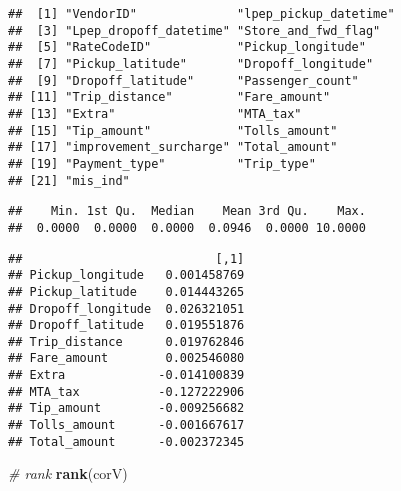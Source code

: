 \documentclass[]{article}
\newenvironment{Shaded}{\begin{snugshade}}{\end{snugshade}}
\newcommand{\KeywordTok}[1]{\textcolor[rgb]{0.13,0.29,0.53}{\textbf{{#1}}}}
\newcommand{\DataTypeTok}[1]{\textcolor[rgb]{0.13,0.29,0.53}{{#1}}}
\newcommand{\StringTok}[1]{\textcolor[rgb]{0.31,0.60,0.02}{{#1}}}
\newcommand{\CommentTok}[1]{\textcolor[rgb]{0.56,0.35,0.01}{\textit{{#1}}}}
\newcommand{\NormalTok}[1]{{#1}}
\begin{document}
\begin{verbatim}
##  [1] "VendorID"              "lpep_pickup_datetime" 
##  [3] "Lpep_dropoff_datetime" "Store_and_fwd_flag"   
##  [5] "RateCodeID"            "Pickup_longitude"     
##  [7] "Pickup_latitude"       "Dropoff_longitude"    
##  [9] "Dropoff_latitude"      "Passenger_count"      
## [11] "Trip_distance"         "Fare_amount"          
## [13] "Extra"                 "MTA_tax"              
## [15] "Tip_amount"            "Tolls_amount"         
## [17] "improvement_surcharge" "Total_amount"         
## [19] "Payment_type"          "Trip_type"            
## [21] "mis_ind"
\end{verbatim}

\begin{Shaded}
\end{Shaded}

\begin{verbatim}
##    Min. 1st Qu.  Median    Mean 3rd Qu.    Max. 
##  0.0000  0.0000  0.0000  0.0946  0.0000 10.0000
\end{verbatim}

\begin{Shaded}
\end{Shaded}

\begin{verbatim}
##                           [,1]
## Pickup_longitude   0.001458769
## Pickup_latitude    0.014443265
## Dropoff_longitude  0.026321051
## Dropoff_latitude   0.019551876
## Trip_distance      0.019762846
## Fare_amount        0.002546080
## Extra             -0.014100839
## MTA_tax           -0.127222906
## Tip_amount        -0.009256682
## Tolls_amount      -0.001667617
## Total_amount      -0.002372345
\end{verbatim}

\begin{Shaded}
\begin{Highlighting}[]
 \CommentTok{# rank }
\KeywordTok{rank}\NormalTok{(corV) }
\end{Highlighting}
\end{Shaded}
\end{document}
